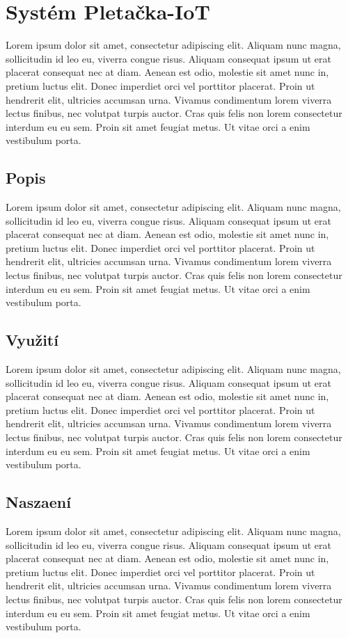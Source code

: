 \chapter{Systém Pletačka-IoT}
Lorem ipsum dolor sit amet, consectetur adipiscing elit.
Aliquam nunc magna, sollicitudin id leo eu, viverra congue risus.
Aliquam consequat ipsum ut erat placerat consequat nec at diam. 
Aenean est odio, molestie sit amet nunc in, pretium luctus elit. 
Donec imperdiet orci vel porttitor placerat. 
Proin ut hendrerit elit, ultricies accumsan urna. 
Vivamus condimentum lorem viverra lectus finibus, nec volutpat turpis auctor.
Cras quis felis non lorem consectetur interdum eu eu sem. 
Proin sit amet feugiat metus. 
Ut vitae orci a enim vestibulum porta. 

\section{Popis}
Lorem ipsum dolor sit amet, consectetur adipiscing elit.
Aliquam nunc magna, sollicitudin id leo eu, viverra congue risus.
Aliquam consequat ipsum ut erat placerat consequat nec at diam. 
Aenean est odio, molestie sit amet nunc in, pretium luctus elit. 
Donec imperdiet orci vel porttitor placerat. 
Proin ut hendrerit elit, ultricies accumsan urna. 
Vivamus condimentum lorem viverra lectus finibus, nec volutpat turpis auctor.
Cras quis felis non lorem consectetur interdum eu eu sem. 
Proin sit amet feugiat metus. 
Ut vitae orci a enim vestibulum porta. 

\section{Využití}
Lorem ipsum dolor sit amet, consectetur adipiscing elit.
Aliquam nunc magna, sollicitudin id leo eu, viverra congue risus.
Aliquam consequat ipsum ut erat placerat consequat nec at diam. 
Aenean est odio, molestie sit amet nunc in, pretium luctus elit. 
Donec imperdiet orci vel porttitor placerat. 
Proin ut hendrerit elit, ultricies accumsan urna. 
Vivamus condimentum lorem viverra lectus finibus, nec volutpat turpis auctor.
Cras quis felis non lorem consectetur interdum eu eu sem. 
Proin sit amet feugiat metus. 
Ut vitae orci a enim vestibulum porta. 


\section{Naszaení}
Lorem ipsum dolor sit amet, consectetur adipiscing elit.
Aliquam nunc magna, sollicitudin id leo eu, viverra congue risus.
Aliquam consequat ipsum ut erat placerat consequat nec at diam. 
Aenean est odio, molestie sit amet nunc in, pretium luctus elit. 
Donec imperdiet orci vel porttitor placerat. 
Proin ut hendrerit elit, ultricies accumsan urna. 
Vivamus condimentum lorem viverra lectus finibus, nec volutpat turpis auctor.
Cras quis felis non lorem consectetur interdum eu eu sem. 
Proin sit amet feugiat metus. 
Ut vitae orci a enim vestibulum porta. 


\newpage